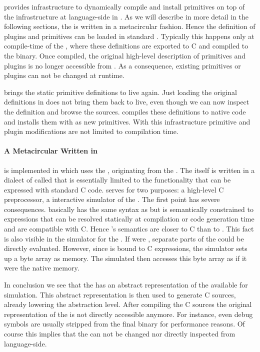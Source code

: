 \WF provides infrastructure to dynamically compile and install primitives on top of the \B infrastructure at language-side in \PH.
As we will describe in more detail in the following sections, the \PH \VM is written in a metacircular fashion.
Hence the definition of plugins and primitives can be loaded in standard \PH.
Typically this happens only at compile-time of the \VM, where these definitions are exported to C and compiled to the \VM binary.
Once compiled, the original high-level description of primitives and plugins is no longer accessible from \PH.
As a consequence, existing primitives or plugins can not be changed at runtime.

\WF brings the static primitive definitions to live again.
Just loading the original definitions in \PH does not bring them back to live, even though we can now inspect the definition and browse the sources.
\WF compiles these definitions to native code and installs them with \B as new primitives.
With this infrastructure primitive and plugin modifications are not limited to \VM compilation time.

\paragraph{A Metacircular \VM Written in \Slang}

\WF is implemented in \PH which uses the , originating from the \Squeak \VM\cite{Inga97a}.
The \VM itself is written in a dialect of \ST called \Slang that is essentially limited to the functionality that can be expressed with standard C code.
\Slang serves for two purposes: a high-level C preprocessor, a interactive simulator of the \VM.
The first point has severe consequences.
\Slang basically has the same syntax as \ST but is semantically constrained to expressions that can be resolved statically at compilation or code generation time and are compatible with C.
Hence \Slang's semantics are closer to C than to \ST.
This fact is also visible in the simulator for the \VM.
If \Slang were \ST, separate parts of the \VM could be directly evaluated.
However, since \Slang is bound to C expressions, the simulator sets up a byte array as memory.
The simulated \VM then accesses this byte array as if it were the native memory.

In conclusion we see that the \PH \VM has an abstract representation of the \VM available for simulation.
This abstract representation is then used to generate C sources, already lowering the abstraction level.
After compiling the C sources the original representation of the \VM is not directly accessible anymore.
For instance, even debug symbols are usually stripped from the final binary for performance reasons.
Of course this implies that the \VM can not be changed nor directly inspected from language-side.


